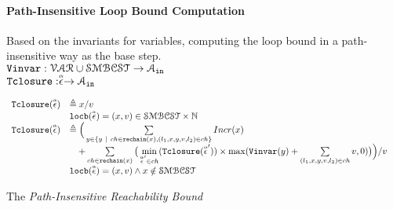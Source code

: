 \paragraph*{Path-Insensitive Loop Bound Computation}
Based on the invariants for variables, computing the loop bound in a path-insensitive way as the base step.
\\ 
$ {\mathtt{Vinvar}}: \mathcal{VAR} \cup \mathcal{SMBCST} \to \mathcal{A}_{\mathtt{in}}$
\\
${\mathtt{Tclosure}}: \stackrel{\scriptscriptstyle{\alpha}}{\mathtt{\epsilon}{}} \to \mathcal{A}_{\mathtt{in}}$
\\
%
\begin{defn}
  \label{def:transition_closure}
\[ 
\begin{array}{lll}
  {\ensuremath{\mathtt{Tclosure}}}(\stackrel{\scriptscriptstyle{\alpha}}{\mathtt{\epsilon}{}}) 
  & \triangleq x / v & \\ 
  & \mathtt{locb}(\stackrel{\scriptscriptstyle{\alpha}}{\mathtt{\epsilon}{}}) = (x, v) \in \mathcal{SMBCST} \times \mathbb{N} & \\
  {\mathtt{Tclosure}}(\stackrel{\scriptscriptstyle{\alpha}}{\mathtt{\epsilon}{}}) 
  & \triangleq \Big(
    \sum\limits_{y \in \{ y ~|~ 
    ch \in \mathtt{rechain}(x), (l_1, x, y, v, l_2) \in ch \} } Incr(x) & \\
    & \quad + 
  \sum\limits_{ch \in \mathtt{rechain}(x)}
  \big( \min\limits_{\stackrel{\scriptscriptstyle{\alpha}}{\mathtt{\epsilon}{}}' \in ch}({{\mathtt{Tclosure}}(\stackrel{\scriptscriptstyle{\alpha}}{\mathtt{\epsilon}{}}')}) \times 
  \max({\mathtt{Vinvar}}(y) + \sum\limits_{(l_1, x, y, v, l_2) \in ch } v, 0)\big) \Big) / v & \\
  & \mathtt{locb}(\stackrel{\scriptscriptstyle{\alpha}}{\mathtt{\epsilon}{}}) = (x, v) \land x \notin \mathcal{SMBCST} & 
\end{array}
  \]
\end{defn}
The \emph{Path-Insensitive Reachability Bound} 

